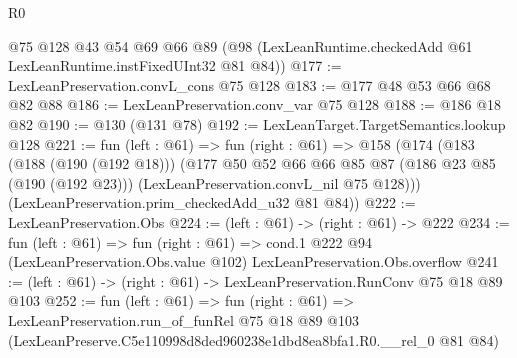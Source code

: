 \begin{lexlean}{R0}
\begin{coremodule}
    @75
    @128
    @43
    @54
    @69
    @66
    @89
    (@98 (LexLeanRuntime.checkedAdd @61 LexLeanRuntime.instFixedUInt32 @81 @84))
@177 := LexLeanPreservation.convL_cons @75 @128
@183 := @177 @48 @53 @66 @68 @82 @88
@186 := LexLeanPreservation.conv_var @75 @128
@188 := @186 @18 @82
@190 := @130 (@131 @78)
@192 := LexLeanTarget.TargetSemantics.lookup @128
@221 := fun (left : @61) =>
  fun (right : @61) =>
  @158
    (@174
      (@183
        (@188 (@190 (@192 @18)))
        (@177
          @50
          @52
          @66
          @66
          @85
          @87
          (@186 @23 @85 (@190 (@192 @23)))
          (LexLeanPreservation.convL_nil @75 @128)))
      (LexLeanPreservation.prim_checkedAdd_u32 @81 @84))
@222 := LexLeanPreservation.Obs
@224 := (left : @61) -> (right : @61) -> @222
@234 := fun (left : @61) =>
  fun (right : @61) =>
  cond.{1} @222 @94 (LexLeanPreservation.Obs.value @102) LexLeanPreservation.Obs.overflow
@241 := (left : @61) -> (right : @61) -> LexLeanPreservation.RunConv @75 @18 @89 @103
@252 := fun (left : @61) =>
  fun (right : @61) =>
  LexLeanPreservation.run_of_funRel
    @75
    @18
    @89
    @103
    (LexLeanPreserve.C5e110998d8ded960238e1dbd8ea8bfa1.R0.__rel_0 @81 @84)
\end{coremodule}
\end{lexlean}
